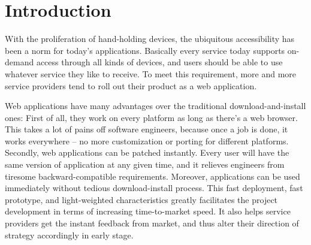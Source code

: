 \documentclass[conference]{IEEEtran}
\begin{document}
%
%
%
\section{Introduction}
With the proliferation of hand-holding devices,
the ubiquitous accessibility has been a norm for today's applications.
Basically every service today supports on-demand access through all kinds of devices,
and users should be able to use whatever service they like to receive.
To meet this requirement, more and more service providers tend to roll
out their product as a
web application.

Web applications have many advantages over the traditional download-and-install ones:
First of all, they work on every platform as long as there's a web browser.
This takes a lot of pains off software engineers, because once a job is done, it works everywhere
-- no more customization or porting for different platforms.
Secondly, web applications can be patched instantly.
Every user will have the same version of application at any given time,
and it relieves engineers from
tiresome backward-compatible requirements.
Moreover,
applications can be used immediately without tedious download-install process.
This fast deployment, fast prototype, and light-weighted characteristics
greatly facilitates the project development in terms of
increasing time-to-market speed.
It also helps service providers get the instant
feedback from market, and thus alter their direction of strategy accordingly in early stage.
\end{document}
